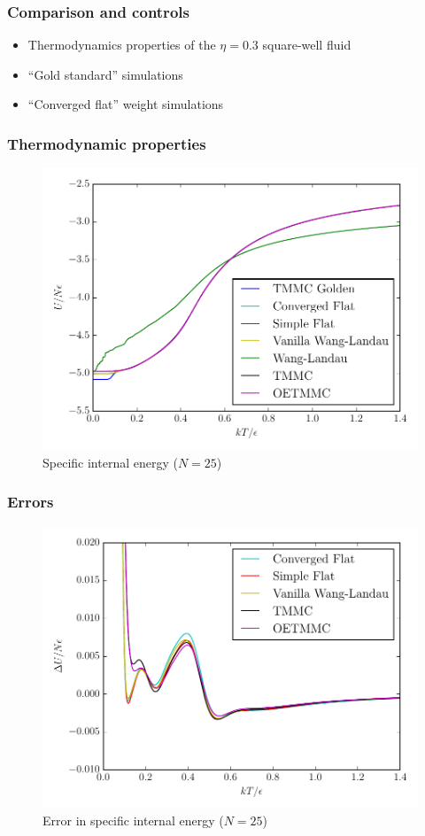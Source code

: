 \documentclass{beamer}
\let\olditem\item
\renewcommand{\item}{\setlength{\itemsep}{6pt}\olditem}
\begin{document}
\begin{frame}
  \frametitle{Comparison and controls}
  \begin{itemize}
  \item Thermodynamics properties of the $\eta=0.3$ square-well fluid
  \item ``Gold standard'' simulations
  \item ``Converged flat'' weight simulations
  \end{itemize}
\end{frame}

\begin{frame}
  \frametitle{Thermodynamic properties}
  \begin{figure}
    \centering
    \includegraphics[height=0.75\textheight]{figs/internal-energy.pdf}
    \caption{Specific internal energy ($N=25$)}
  \end{figure}
\end{frame}

\begin{frame}
  \frametitle{Errors}
  \begin{figure}
    \centering
    \includegraphics[height=0.75\textheight]{figs/u-err.pdf}
    \caption{Error in specific internal energy ($N=25$)}
  \end{figure}
\end{frame}
\end{document}

